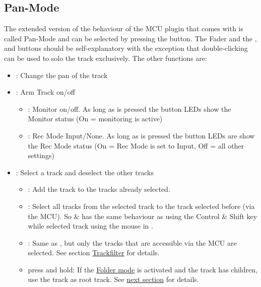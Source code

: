 \subsection{Pan-Mode}\label{panmode} 
The extended version of the behaviour of the MCU plugin that comes
with \reaper is called Pan-Mode and can be selected by pressing the \pan
button. The Fader and the \vpots,  \mute and \solo buttons should be
self-explanatory with the exception that double-clicking \solo can be
used to solo the track exclusively. The other functions are:

\begin{itemize}
\item \vpots: Change the pan of the track

\item \rec: Arm Track on/off
        \bemod
        \begin{itemize}
        \item \shift: Monitor on/off. As long as \shift is pressed the
          \rec button LEDs show the Monitor status (On = monitoring
          is active)
        \item \option: Rec Mode Input/None. As long as \option is
          pressed the \solo button LEDs are show the Rec Mode
          status (On = Rec Mode is set to Input, Off = all other
          settings)
        \end{itemize}
        
\item \select: Select a track and deselect the other tracks
        \bemod 
        \begin{itemize}
        \item \control: Add the track to the tracks already selected.
        \item \shift: Select all tracks from the selected track to the
          track selected before (via the MCU). So \control \& \shift
          has the same behaviour as using the Control \& Shift key
          while selected track using the mouse in \reaper.
        \item \alt: Same as \shift, but only the tracks that are
          accessible via the MCU are selected. See section
          \hyperref[trackfilter]{Trackfilter} for details.
        \item press and hold: If the \hyperref[foldermode]{Folder
            mode} is activated and the track has children, use the
          track as root track. See \hyperref[foldermode]{next
            section} for details.
        \end{itemize}


\end{itemize}
